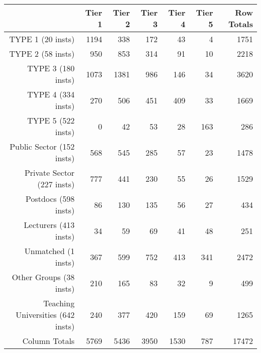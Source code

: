 \begin{tabular}{rrrrrrr}
  \hline
   & \textbf{Tier 1} & \textbf{Tier 2} & \textbf{Tier 3} & \textbf{Tier 4} & \textbf{Tier 5} & \textbf{Row Totals} \\\hline
  TYPE 1 (20 insts) & 1194 & 338 & 172 & 43 & 4 & 1751 \\
  TYPE 2 (58 insts) & 950 & 853 & 314 & 91 & 10 & 2218 \\
  TYPE 3 (180 insts) & 1073 & 1381 & 986 & 146 & 34 & 3620 \\
  TYPE 4 (334 insts) & 270 & 506 & 451 & 409 & 33 & 1669 \\
  TYPE 5 (522 insts) & 0 & 42 & 53 & 28 & 163 & 286 \\
  Public Sector (152 insts) & 568 & 545 & 285 & 57 & 23 & 1478 \\
  Private Sector (227 insts) & 777 & 441 & 230 & 55 & 26 & 1529 \\
  Postdocs (598 insts) & 86 & 130 & 135 & 56 & 27 & 434 \\
  Lecturers (413 insts) & 34 & 59 & 69 & 41 & 48 & 251 \\
  Unmatched (1 insts) & 367 & 599 & 752 & 413 & 341 & 2472 \\
  Other Groups (38 insts) & 210 & 165 & 83 & 32 & 9 & 499 \\
  Teaching Universities (642 insts) & 240 & 377 & 420 & 159 & 69 & 1265 \\
  Column Totals & 5769 & 5436 & 3950 & 1530 & 787 & 17472 \\\hline
\end{tabular}
